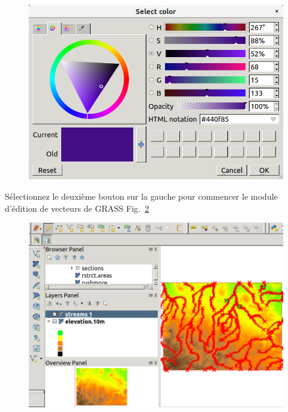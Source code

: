 \begin{figure}[htbp]
   \centering
   \includegraphics[scale=0.35]{qgis023.png}
   \caption{}
   \label{fig:qgis023}
\end{figure}

S\'electionnez le deuxi\`eme bouton sur la gauche pour commencer le module d'\'edition de vecteurs de GRASS Fig.~\ref{fig:qgis024}

\begin{figure}[htbp]
   \centering
   \includegraphics[scale=0.25]{qgis024.png}
   \caption{}
   \label{fig:qgis024}
\end{figure}


